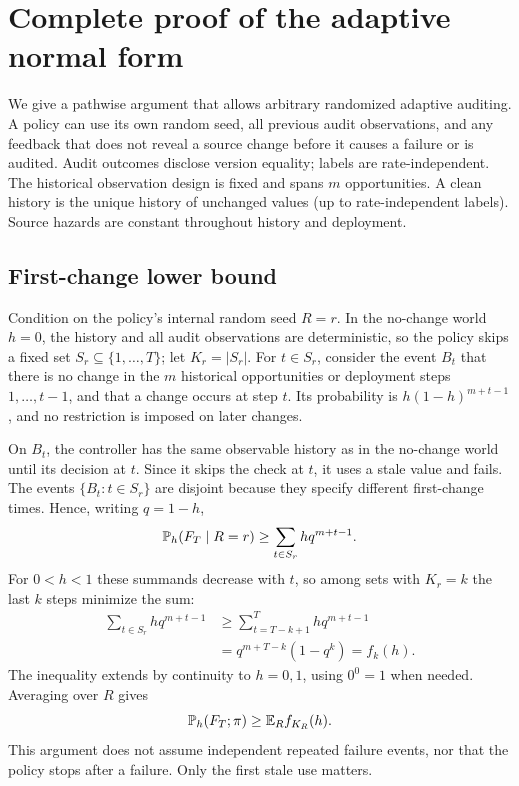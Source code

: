 \section{Complete proof of the adaptive normal form}\label{app:normal}
We give a pathwise argument that allows arbitrary randomized adaptive auditing. A policy can use its own random seed, all previous audit observations, and any feedback that does not reveal a source change before it causes a failure or is audited. Audit outcomes disclose version equality; labels are rate-independent. The historical observation design is fixed and spans $m$ opportunities. A clean history is the unique history of unchanged values (up to rate-independent labels). Source hazards are constant throughout history and deployment.

\subsection{First-change lower bound}
Condition on the policy's internal random seed $R=r$. In the no-change world $h=0$, the history and all audit observations are deterministic, so the policy skips a fixed set $S_r\subseteq\{1,\ldots,T\}$; let $K_r=|S_r|$. For $t\in S_r$, consider the event $B_t$ that there is no change in the $m$ historical opportunities or deployment steps $1,\ldots,t-1$, and that a change occurs at step $t$. Its probability is $h(1-h)^{m+t-1}$, and no restriction is imposed on later changes.

On $B_t$, the controller has the same observable history as in the no-change world until its decision at $t$. Since it skips the check at $t$, it uses a stale value and fails. The events $\{B_t:t\in S_r\}$ are disjoint because they specify different first-change times. Hence, writing $q=1-h$,
\begin{equation}
 \mathbb P_h(F_T\mid R=r)\geq \sum_{t\in S_r}h q^{m+t-1}.
\end{equation}
For $0<h<1$ these summands decrease with $t$, so among sets with $K_r=k$ the last $k$ steps minimize the sum:
\begin{align}
 \sum_{t\in S_r} hq^{m+t-1}
 &\geq \sum_{t=T-k+1}^T hq^{m+t-1}\\
 &=q^{m+T-k}(1-q^k)=f_k(h).
\end{align}
The inequality extends by continuity to $h=0,1$, using $0^0=1$ when needed. Averaging over $R$ gives
\begin{equation}
 \mathbb P_h(F_T;\pi)\geq \mathbb E_R f_{K_R}(h).\label{eq:seedbound}
\end{equation}
This argument does not assume independent repeated failure events, nor that the policy stops after a failure. Only the first stale use matters.

